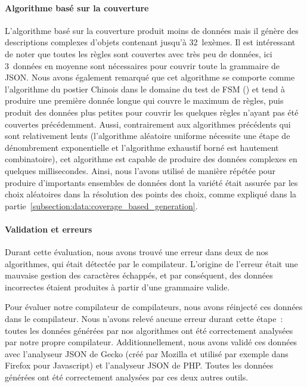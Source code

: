 \paragraph{Algorithme basé sur la couverture} L'algorithme basé sur la
couverture produit moins de données mais il génère des descriptions complexes
d'objets contenant jusqu'à 32~lexèmes. Il est intéressant de noter que toutes
les règles sont couvertes avec très peu de données, ici 3~données en moyenne
sont nécessaires pour couvrir toute la grammaire de JSON. Nous avons également
remarqué que cet algorithme se comporte comme l'algorithme du postier Chinois
dans le domaine du test de FSM () et tend à
produire une première donnée longue qui couvre le maximum de règles, puis
produit des données plus petites pour couvrir les quelques règles n'ayant pas
été couvertes précédemment. Aussi, contrairement aux algorithmes précédents qui
sont relativement lents (l'algorithme aléatoire uniforme nécessite une étape de
dénombrement exponentielle et l'algorithme exhaustif borné est hautement
combinatoire), cet algorithme est capable de produire des données complexes en
quelques millisecondes. Ainsi, nous l'avons utilisé de manière répétée pour
produire d'importants ensembles de données dont la variété était assurée par les
choix aléatoires dans la résolution des points des choix, comme expliqué dans la
partie~\ref{subsection:data:coverage_based_generation}.

\paragraph{Validation et erreurs} Durant cette évaluation, nous avons trouvé une
erreur dans deux de nos algorithmes, qui était détectée par le compilateur.
L'origine de l'erreur était une mauvaise gestion des caractères échappés, et par
conséquent, des données incorrectes étaient produites à partir d'une grammaire
valide.

Pour évaluer notre compilateur de compilateurs, nous avons réinjecté ces données
dans le compilateur. Nous n'avons relevé aucune erreur durant cette étape~:
toutes les données générées par nos algorithmes ont été correctement analysées
par notre propre compilateur. Additionnellement, nous avons validé ces données
avec l'analyseur JSON de Gecko (créé par Mozilla et utilisé par exemple dans
Firefox pour Javascript) et l'analyseur JSON de PHP. Toutes les données générées
ont été correctement analysées par ces deux autres outils.


